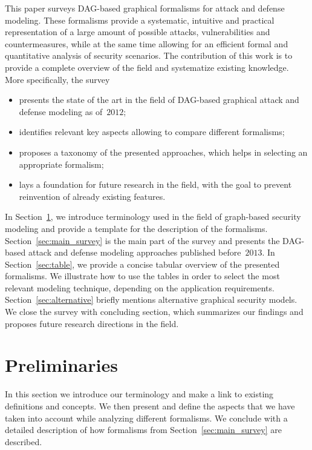 \documentclass[a4paper]{article}
\begin{document}
This paper surveys DAG-based graphical formalisms for attack and defense 
modeling. These formalisms provide a systematic, intuitive and practical
representation of a large amount of possible attacks, vulnerabilities and
countermeasures, while at the same time allowing for an efficient formal and
quantitative analysis of security scenarios. 
The contribution of this work is to 
provide a complete overview of the field and systematize  existing 
knowledge. More specifically, the survey 

\begin{itemize}
\item presents the state of the art in the field of DAG-based
graphical attack and defense modeling as of~$2012$;
\item identifies relevant key aspects allowing to compare different formalisms;
\item proposes a taxonomy of the presented approaches, which helps in selecting
an appropriate formalism;
\item lays a foundation for future research in the field, with the goal to
prevent reinvention of already existing features.
\end{itemize}

In Section~\ref{sec:prelims}, we introduce terminology used in the field of
graph-based security modeling and provide a template for the description of the
formalisms. Section~\ref{sec:main_survey} is the main part of the survey and
presents the DAG-based attack and defense modeling approaches published
before~$2013$. In Section~\ref{sec:table}, we provide a concise tabular 
overview of the presented formalisms. We illustrate how to use the tables in
order to select the most relevant modeling technique, depending on the
application requirements. Section~\ref{sec:alternative} briefly mentions
alternative  graphical security models. We close the survey with concluding
section, which  summarizes our findings and proposes future research directions 
in the field. 

\section{Preliminaries}
\label{sec:prelims}

In this section we introduce our terminology and make a link to existing 
definitions and concepts. We then present and define the aspects that we have
taken into account while analyzing different formalisms. We conclude with a
detailed description of how formalisms from Section~\ref{sec:main_survey} are
described. 
\end{document}
